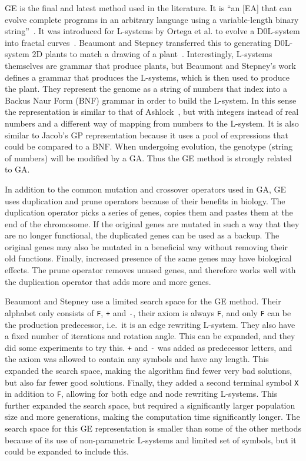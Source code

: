 \gls{GE} is the final and latest method used in the literature.
It is ``an [\gls{EA}] that can evolve complete programs in an arbitrary language using a variable-length binary string''~\cite{2003Oneil}.
It was introduced for \glspl{L-system} by Ortega et al. to evolve a D0L-system into fractal curves~\cite{2003Ortega}.
Beaumont and Stepney transferred this to generating D0L-system 2D plants to match a drawing of a plant~\cite{2009Beaumont}.
Interestingly, \glspl{L-system} themselves are grammar that produce plants, but Beaumont and Stepney's work defines a grammar that produces the \glspl{L-system}, which is then used to produce the plant.
They represent the genome as a string of numbers that index into a Backus Naur Form (BNF) grammar in order to build the \gls{L-system}.
In this sense the representation is similar to that of Ashlock~\cite{2006Ashlock}, but with integers instead of real numbers and a different way of mapping from numbers to the \gls{L-system}.
It is also similar to Jacob's \gls{GP} representation because it uses a pool of expressions that could be compared to a BNF.
When undergoing evolution, the genotype (string of numbers) will be modified by a \gls{GA}.
Thus the \gls{GE} method is strongly related to \gls{GA}.

In addition to the common mutation and crossover operators used in \gls{GA}, \gls{GE} uses duplication and prune operators because of their benefits in biology.
The duplication operator picks a series of genes, copies them and pastes them at the end of the chromosome.
If the original genes are mutated in such a way that they are no longer functional, the duplicated genes can be used as a backup.
The original genes may also be mutated in a beneficial way without removing their old functions.
Finally, increased presence of the same genes may have biological effects.
The prune operator removes unused genes, and therefore works well with the duplication operator that adds more and more genes.~\cite{1998Ryan}

Beaumont and Stepney use a limited search space for the \gls{GE} method.
Their alphabet only consists of \texttt{F}, \texttt{+} and \texttt{-}, their axiom is always \texttt{F}, and only \texttt{F} can be the production predecessor, i.e.\ it is an edge rewriting \gls{L-system}.
They also have a fixed number of iterations and rotation angle.
This can be expanded, and they did some experiments to try this.
\texttt{+} and \texttt{-} was added as predecessor letters, and the axiom was allowed to contain any symbols and have any length.
This expanded the search space, making the algorithm find fewer very bad solutions, but also far fewer good solutions.
Finally, they added a second terminal symbol \texttt{X} in addition to \texttt{F}, allowing for both edge and node rewriting \glspl{L-system}.
This further expanded the search space, but required a significantly larger population size and more generations, making the computation time significantly longer.
The search space for this \gls{GE} representation is smaller than some of the other methods because of its use of non-parametric \glspl{L-system} and limited set of symbols, but it could be expanded to include this.

